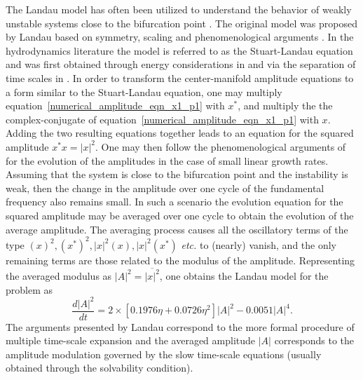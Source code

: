 The Landau model has often been utilized to understand the behavior of weakly unstable systems close to the bifurcation point \citep{dusek94,sipp07,carini15,meliga12}. The original model was proposed by Landau based on symmetry, scaling and phenomenological arguments \citep{landau_52}. In the hydrodynamics literature the model is referred to as the Stuart-Landau equation and was first obtained through energy considerations in \cite{stuart58} and via the separation of time scales in \cite{stuart60,watson60}. In order to transform the center-manifold amplitude equations to a form similar to the Stuart-Landau equation, one may multiply equation~\eqref{numerical_amplitude_eqn_x1_p1} with $x^{*}$, and multiply the the complex-conjugate of equation~\eqref{numerical_amplitude_eqn_x1_p1} with $x$. Adding the two resulting equations together leads to an equation for the squared amplitude $x^{*}x = |x|^{2}$. One may then follow the phenomenological arguments of \cite{landau_52} for the evolution of the amplitudes in the case of small linear growth rates. Assuming that the system is close to the bifurcation point and the instability is weak, then the change in the amplitude over one cycle of the fundamental frequency also remains small. In such a scenario the evolution equation for the squared amplitude may be averaged over one cycle to obtain the evolution of the average amplitude. The averaging process causes all the oscillatory terms of the type $(x)^{2},(x^{*})^{2},|x|^{2}(x),|x|^{2}(x^{*})$ \textit{etc.} to (nearly) vanish, and the only remaining terms are those related to the modulus of the amplitude. Representing the averaged modulus as $|A|^{2} = \overline{|x|^{2}}$, one obtains the Landau model for the problem as
\begin{equation}
	\label{landau_eqn_1}
		\dfrac{d|A|^{2}}{dt} = 2\times[0.1976\eta + 0.0726\eta^{2}] |A|^{2} - 0.0051|A|^{4}.
\end{equation}
The arguments presented by Landau correspond to the more formal procedure of multiple time-scale expansion and the averaged amplitude $|A|$ corresponds to the amplitude modulation governed by the slow time-scale equations (usually obtained through the solvability condition).

